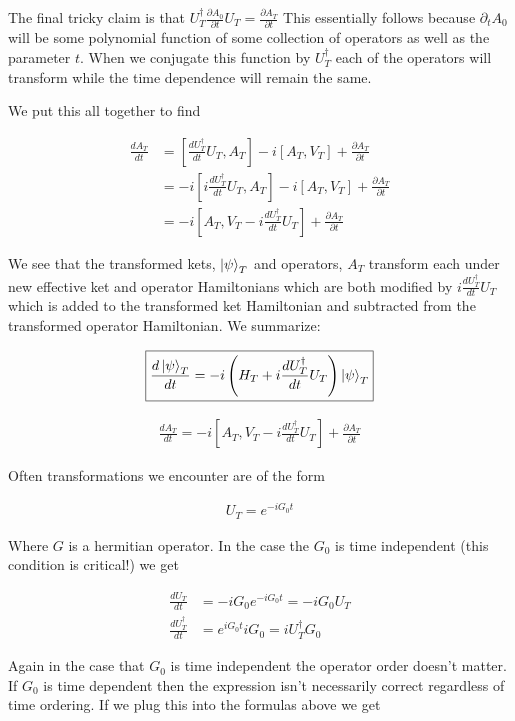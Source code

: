 \documentclass[12pt]{article}
\newcommand{\ddt}[1]{\frac{d #1}{dt}}
\begin{document}
The final tricky claim is that $U_T^{\dag} \frac{\partial A_0}{\partial t} U_T = \frac{\partial A_T}{\partial t}$ This essentially follows because $\partial_t A_0$ will be some polynomial function of some collection of operators as well as the parameter $t$. When we conjugate this function by $U_T^{\dag}$ each of the operators will transform while the time dependence will remain the same.

We put this all together to find

\begin{align}
\ddt{A_T} &= \left[\ddt{U_T^{\dag}}U_T,A_T \right] -i [A_T,V_T] + \frac{\partial A_T}{\partial t}\\
&= -i  \left[i\ddt{U_T^{\dag}}U_T,A_T \right] -i [A_T,V_T] + \frac{\partial A_T}{\partial t}\\
&= -i \left[A_T, V_T - i \ddt{U_T^{\dag}}U_T\right] + \frac{\partial A_T}{\partial t}
\end{align}

We see that the transformed kets, $\ket{\psi}_T$ and operators, $A_T$ transform each under new effective ket and operator Hamiltonians which are both modified by $i\ddt{U_T^{\dag}}U_T$ which is added to the transformed ket Hamiltonian and subtracted from the transformed operator Hamiltonian. We summarize:

\begin{align}
\boxed{\ddt{\ket{\psi}_T} = -i \left(H_T + i\ddt{U_T^{\dag}}U_T \right) \ket{\psi}_T}
\end{align}

\begin{align}
\boxed{
	\ddt{A_T} = -i\left[A_T, V_T -i\ddt{U_T^{\dag}}U_T \right] + \frac{\partial A_T}{\partial t}
}
\end{align}

Often transformations we encounter are of the form

\begin{align}
U_T = e^{-i G_0 t}
\end{align}

Where $G$ is a hermitian operator. In the case the $G_0$ is time independent (this condition is critical!) we get

\begin{align}
\ddt{U_T} &= -iG_0 e^{-iG_0t} = -iG_0 U_T\\
\ddt{U_T^{\dag}} &= e^{iG_0t} iG_0 = iU_T^{\dag} G_0
\end{align}

Again in the case that $G_0$ is time independent the operator order doesn't matter. If $G_0$ is time dependent then the expression isn't necessarily correct regardless of time ordering. If we plug this into the formulas above we get
\end{document}

